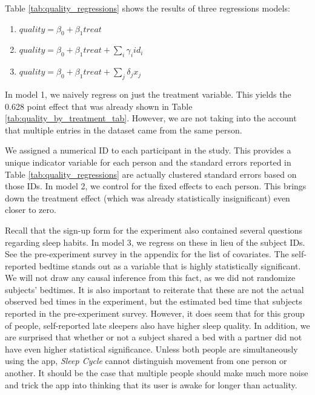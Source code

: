 \documentclass[12pt,]{article}
\providecommand{\tightlist}{%
  \setlength{\itemsep}{0pt}\setlength{\parskip}{0pt}}
\begin{document}
Table \ref{tab:quality_regressions} shows the results of three
regressions models:

\begin{enumerate}
\def\labelenumi{\arabic{enumi}.}
\tightlist
\item
  \(quality = \beta_0 + \beta_1 treat\)
\item
  \(quality = \beta_0 + \beta_1 treat + \sum_i \gamma_i id_i\)
\item
  \(quality = \beta_0 + \beta_1 treat + \sum_j \delta_j x_j\)
\end{enumerate}

In model 1, we naively regress on just the treatment variable. This
yields the 0.628 point effect that was already shown in Table
\ref{tab:quality_by_treatment_tab}. However, we are not taking into the
account that multiple entries in the dataset came from the same person.

We assigned a numerical ID to each participant in the study. This
provides a unique indicator variable for each person and the standard
errors reported in Table \ref{tab:quality_regressions} are actually
clustered standard errors based on those IDs. In model 2, we control for
the fixed effects to each person. This brings down the treatment effect
(which was already statistically insignificant) even closer to zero.

Recall that the sign-up form for the experiment also contained several
questions regarding sleep habits. In model 3, we regress on these in
lieu of the subject IDs. See the pre-experiment survey in the appendix
for the list of covariates. The self-reported bedtime stands out as a
variable that is highly statistically significant. We will not draw any
causal inference from this fact, as we did not randomize subjects'
bedtimes. It is also important to reiterate that these are not the
actual observed bed times in the experiment, but the estimated bed time
that subjects reported in the pre-experiment survey. However, it does
seem that for this group of people, self-reported late sleepers also
have higher sleep quality. In addition, we are surprised that whether or
not a subject shared a bed with a partner did not have even higher
statistical significance. Unless both people are simultaneously using
the app, \emph{Sleep Cycle} cannot distinguish movement from one person
or another. It should be the case that multiple people should make much
more noise and trick the app into thinking that its user is awake for
longer than actuality.
\end{document}
